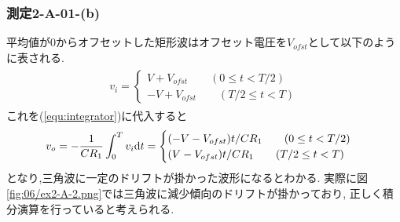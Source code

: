 \subsubsection{測定2-A-01-(b)}
平均値が0からオフセットした矩形波はオフセット電圧を$V_{ofst}$として以下のように表される.
\begin{align}
  \begin{split}
    v_i=
    \begin{cases}
      V+V_{ofst}\qquad(0\leq t<T/2)\\
      -V+V_{ofst}\qquad(T/2\leq t<T)
    \end{cases}
  \end{split}
\end{align}
これを(\ref{equ:integrator})に代入すると
\begin{align}
  \label{equ:complete_integrator_rect}
  \begin{split}
    v_o=-\frac{1}{CR_1}\int_0^Tv_i{\rm d}t
    =
    \begin{cases}
      (-V-V_{ofst})t/CR_1\qquad(0\leq t<T/2)\\
      (V-V_{ofst})t/CR_1\qquad(T/2\leq t<T)
    \end{cases}
  \end{split}
\end{align}
となり,三角波に一定のドリフトが掛かった波形になるとわかる.
実際に図\ref{fig:06/ex2-A-2.png}では三角波に減少傾向のドリフトが掛かっており,
正しく積分演算を行っていると考えられる.
